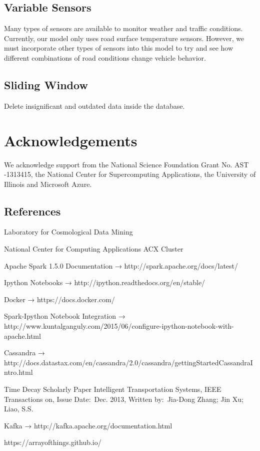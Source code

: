 \documentclass{vldb}
\begin{document}
\subsection{Variable Sensors}
Many types of sensors are available to monitor weather and traffic conditions. Currently, our model only uses road surface temperature sensors. However, we must incorporate other types of sensors into this model to try and see how different combinations of road conditions change vehicle behavior.

\subsection{Sliding Window}
Delete insignificant and outdated data inside the database.


\section{Acknowledgements}
We acknowledge support from the National Science Foundation Grant No. AST -1313415, the National Center for Supercomputing Applications, the University of Illinois and Microsoft Azure.

\subsection{References}
Laboratory for Cosmological Data Mining

National Center for Computing Applications ACX Cluster

Apache Spark 1.5.0 Documentation → http://spark.apache.org/docs/latest/ 

Ipython Notebooks → http://ipython.readthedocs.org/en/stable/ 

Docker → https://docs.docker.com/ 

Spark-Ipython Notebook Integration → http://www.kuntalganguly.com/2015/06/configure-ipython-notebook-with-apache.html 

Cassandra → http://docs.datastax.com/en/cassandra/2.0/cassandra/gettingStartedCassandraIntro.html 

Time Decay Scholarly Paper Intelligent Transportation Systems, IEEE Transactions on, Issue Date: Dec. 2013, Written by: Jia-Dong Zhang; Jin Xu; Liao, S.S.

Kafka → http://kafka.apache.org/documentation.html 

https://arrayofthings.github.io/


\balance
\end{document}
